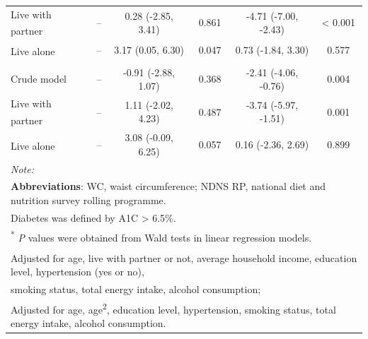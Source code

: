 \begin{table}[H]
\begin{tabular}[t]{lccccc}
		\hspace{1em}\hspace{1em}Live with partner\textsuperscript{\ddag} & -- & 0.28 (-2.85, 3.41) & 0.861 & -4.71 (-7.00, -2.43) & < 0.001\\
		\hspace{1em}\hspace{1em}Live alone\textsuperscript{\ddag} & -- & 3.17 (0.05, 6.30) & 0.047 & 0.73 (-1.84, 3.30) & 0.577\\
		\addlinespace[0.3em]
		\multicolumn{6}{l}{\hspace{1em}\textbf{WC in non-diabetics}}\\
		\hspace{1em}\hspace{1em}Crude model & -- & -0.91 (-2.88, 1.07) & 0.368 & -2.41 (-4.06, -0.76) & 0.004\\
		\hspace{1em}\hspace{1em}Live with partner\textsuperscript{\ddag} & -- & 1.11 (-2.02, 4.23) & 0.487 & -3.74 (-5.97, -1.51) & 0.001\\
		\hspace{1em}\hspace{1em}Live alone\textsuperscript{\ddag} & -- & 3.08 (-0.09, 6.25) & 0.057 & 0.16 (-2.36, 2.69) & 0.899\\
		\bottomrule
		\multicolumn{6}{l}{{\scriptsize \textit{Note: }}}\\
		\multicolumn{6}{l}{{\scriptsize \textbf{Abbreviations}: WC, waist circumference; NDNS RP, national diet and nutrition survey rolling programme.}}\\
		\multicolumn{6}{l}{{\scriptsize Diabetes was defined by A1C > 6.5\%. }}\\
		\multicolumn{6}{l}{{\scriptsize \textsuperscript{*} \textit{P} values were obtained from Wald tests in linear regression models.}}\\
		\multicolumn{6}{l}{{\scriptsize \textsuperscript{\dag} Adjusted for age, live with partner or not, average household income, education level, hypertension (yes or no),}}\\
		\multicolumn{6}{l}{{\scriptsize smoking status, total energy intake, alcohol consumption;}}\\
		\multicolumn{6}{l}{{\scriptsize \textsuperscript{\ddag} Adjusted for age, age\textsuperscript{2}, education level, hypertension, smoking status, total energy intake, alcohol consumption.}}\\
	\end{tabular}
\end{table}
\vspace{-0.3cm}


